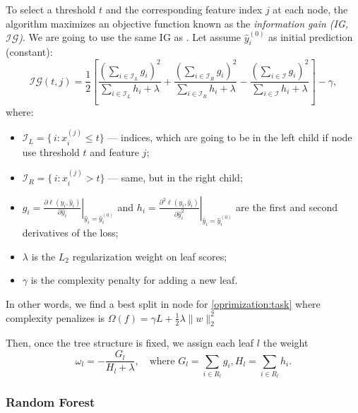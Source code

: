 \documentclass{article}
\begin{document}
To select a threshold \( t \) and the corresponding feature index \( j \) at each node, the algorithm maximizes an objective function known as the \emph{information gain (IG, \(\mathcal{IG}\))}. We are going to use the same IG as \cite{chenXGBoostScalableTree2016a}. Let assume \(\hat{y}_i^{(0)}\) as initial prediction (constant):
\[
    \mathcal{IG}(t, j)
    =
    \frac{1}{2}
    \left[
        \frac{\left(\sum_{i\in \mathcal{I}_L} g_i\right)^2}{\sum_{i\in \mathcal{I}_L} h_i + \lambda}
        +
        \frac{\left(\sum_{i\in \mathcal{I}_R} g_i\right)^2}{\sum_{i\in \mathcal{I}_R} h_i + \lambda}
        -
        \frac{\left(\sum_{i\in \mathcal{I}} g_i\right)^2}{\sum_{i\in \mathcal{I}} h_i + \lambda}
        \right]
    -
    \gamma,
\]
where:
\begin{itemize}
    \item \(\mathcal{I}_L = \{\,i: x_{i}^{(j)} \le t\}\) --- indices, which are going to be in the left child if node use threshold \(t\) and feature \(j\);
    \item \(\mathcal{I}_R = \{\,i: x_{i}^{(j)} > t\}\) --- same, but in the right child;
    \item \(g_i = \left.\frac{\partial \ell(y_i, \hat{y}_i)}{\partial \hat{y}_i}\right|_{\hat y_i = \hat{y}_i^{(0)}}\) and
          \(h_i = \left.\frac{\partial^2 \ell(y_i, \hat{y}_i)}{\partial \hat{y}_i^2}\right|_{\hat y_i = \hat{y}_i^{(0)}}\) are the first and second derivatives of the loss;
    \item \(\lambda\) is the \(L_2\) regularization weight on leaf scores;
    \item \(\gamma\) is the complexity penalty for adding a new leaf.
\end{itemize}

In other words, we find a best split in node for \ref{oprimization:task} where complexity penalizes is \(\Omega(f) = \gamma{L} + \frac{1}{2}\lambda\| w \|^2_2\)

Then, once the tree structure is fixed, we assign each leaf \(l\) the weight
\[
    \omega_l
    =
    -\frac{G_l}{H_l + \lambda},
    \quad
    \text{where }
    G_l = \sum_{i \in R_l} g_i,
    H_l = \sum_{i \in R_l} h_i.
\]

\subsubsection{Random Forest}
\label{model:random-forest}
\end{document}
